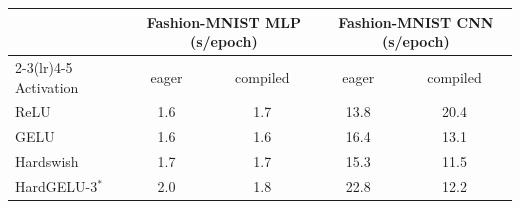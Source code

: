 \begin{tabular}{lcccc}
\toprule
 & \multicolumn{2}{c}{Fashion-MNIST MLP (s/epoch)} & \multicolumn{2}{c}{Fashion-MNIST CNN (s/epoch)} \\
\cmidrule(lr){2-3}\cmidrule(lr){4-5}
Activation & eager & compiled & eager & compiled \\
\midrule
ReLU & 1.6 & 1.7 & 13.8 & 20.4 \\
GELU & 1.6 & 1.6 & 16.4 & 13.1 \\
Hardswish & 1.7 & 1.7 & 15.3 & 11.5 \\
HardGELU-3$^\ast$ & 2.0 & 1.8 & 22.8 & 12.2 \\
\bottomrule
\end{tabular}
